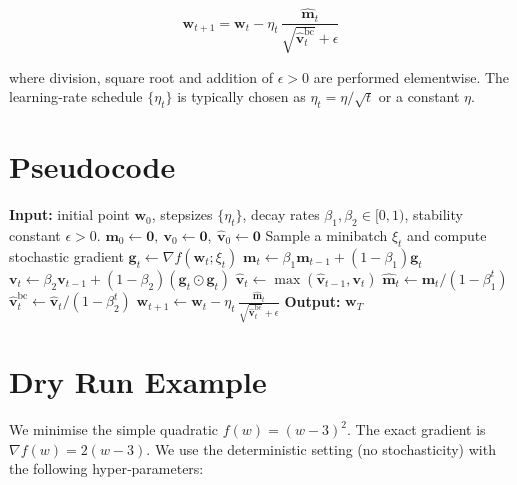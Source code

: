 \documentclass[11pt]{article}
\begin{document}
\[
\boxed{\;
\mathbf{w}_{t+1}= \mathbf{w}_{t}-\eta_{t}\,
\frac{\hat{\mathbf{m}}_{t}}{\sqrt{\hat{\mathbf{v}}_{t}^{\text{bc}}}+\epsilon}\;}
\tag{1}
\]

where division, square root and addition of $\epsilon>0$ are performed
elementwise.  The learning‑rate schedule $\{\eta_{t}\}$ is typically chosen as
$\eta_{t} = \eta/\sqrt{t}$ or a constant $\eta$.

\section{Pseudocode}
\label{sec:pseudo}
\begin{algorithm}[H]
\caption{AMSGrad}
\begin{algorithmic}[1]
\State \textbf{Input:} initial point $\mathbf{w}_{0}$, stepsizes $\{\eta_{t}\}$,
        decay rates $\beta_{1},\beta_{2}\in[0,1)$, stability constant $\epsilon>0$.
\State $\mathbf{m}_{0}\gets\mathbf{0},\ \mathbf{v}_{0}\gets\mathbf{0},\ 
        \hat{\mathbf{v}}_{0}\gets\mathbf{0}$
    \State Sample a minibatch $\xi_{t}$ and compute stochastic gradient
           $\mathbf{g}_{t}\gets\nabla f(\mathbf{w}_{t};\xi_{t})$
    \State $\mathbf{m}_{t}\gets \beta_{1}\mathbf{m}_{t-1}+(1-\beta_{1})\mathbf{g}_{t}$
    \State $\mathbf{v}_{t}\gets \beta_{2}\mathbf{v}_{t-1}+(1-\beta_{2})
                (\mathbf{g}_{t}\odot\mathbf{g}_{t})$
    \State $\hat{\mathbf{v}}_{t}\gets \max(\hat{\mathbf{v}}_{t-1},\mathbf{v}_{t})$
    \State $\hat{\mathbf{m}}_{t}\gets \mathbf{m}_{t}/(1-\beta_{1}^{t})$
    \State $\hat{\mathbf{v}}_{t}^{\text{bc}}\gets \hat{\mathbf{v}}_{t}/(1-\beta_{2}^{t})$
    \State $\mathbf{w}_{t+1}\gets \mathbf{w}_{t}
          -\eta_{t}\,\frac{\hat{\mathbf{m}}_{t}}
          {\sqrt{\hat{\mathbf{v}}_{t}^{\text{bc}}}+\epsilon}$
\EndFor
\State \textbf{Output:} $\mathbf{w}_{T}$
\end{algorithmic}
\end{algorithm}

\section{Dry Run Example}
We minimise the simple quadratic $f(w)=(w-3)^{2}$.
The exact gradient is $\nabla f(w)=2(w-3)$.  We use the deterministic
setting (no stochasticity) with the following hyper‑parameters:
\end{document}
